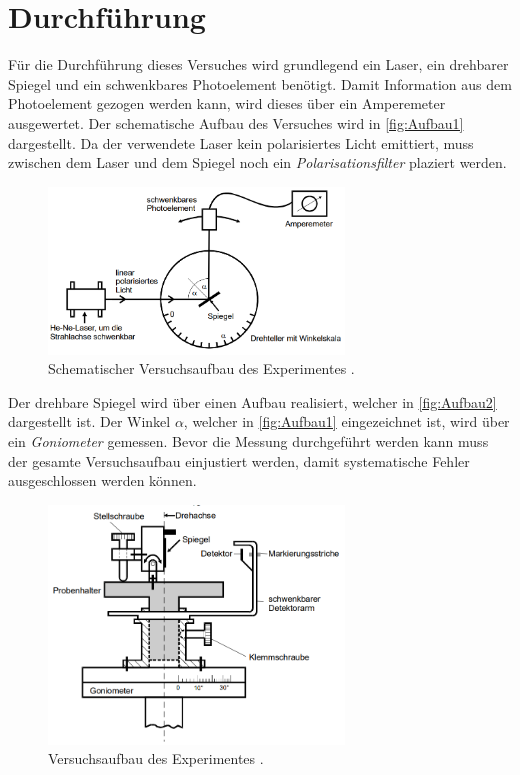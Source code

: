 \section{Durchführung}
\label{sec:Durchführung}
Für die Durchführung dieses Versuches wird grundlegend ein Laser, ein drehbarer Spiegel und ein schwenkbares Photoelement benötigt. Damit Information aus dem Photoelement 
gezogen werden kann, wird dieses über ein Amperemeter ausgewertet. Der schematische Aufbau des Versuches wird in \autoref{fig:Aufbau1} dargestellt. Da der verwendete Laser 
kein polarisiertes Licht emittiert, muss zwischen dem Laser und dem Spiegel noch ein \textit{Polarisationsfilter} plaziert werden. 

\begin{figure}
    \centering
    \includegraphics[width = 0.7\textwidth]{content/Aufbau1.png}
    \caption{Schematischer Versuchsaufbau des Experimentes \cite{v407}.}
    \label{fig:Aufbau1}
\end{figure}

Der drehbare Spiegel wird über einen Aufbau realisiert, welcher in \autoref{fig:Aufbau2} dargestellt ist. Der Winkel $\alpha$, welcher in \autoref{fig:Aufbau1} eingezeichnet 
ist, wird über ein \textit{Goniometer} gemessen. Bevor die Messung durchgeführt werden kann muss der gesamte Versuchsaufbau einjustiert werden, damit systematische Fehler 
ausgeschlossen werden können.  

\begin{figure}
    \centering
    \includegraphics[width = 0.7\textwidth]{content/Aufbau2.png}
    \caption{Versuchsaufbau des Experimentes \cite{v407}.}
    \label{fig:Aufbau2}
\end{figure}

